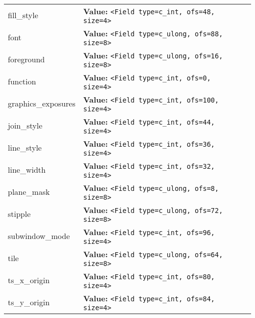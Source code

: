 \begin{longtable}{|p{\varnamewidth}|p{\vardescrwidth}|l}
\cline{1-2}
\raggedright f\-i\-l\-l\-\_\-s\-t\-y\-l\-e\- & \raggedright \textbf{Value:} 
{\tt {\textless}Field type=c\_int, ofs=48, size=4{\textgreater}}&\\
\cline{1-2}
\raggedright f\-o\-n\-t\- & \raggedright \textbf{Value:} 
{\tt {\textless}Field type=c\_ulong, ofs=88, size=8{\textgreater}}&\\
\cline{1-2}
\raggedright f\-o\-r\-e\-g\-r\-o\-u\-n\-d\- & \raggedright \textbf{Value:} 
{\tt {\textless}Field type=c\_ulong, ofs=16, size=8{\textgreater}}&\\
\cline{1-2}
\raggedright f\-u\-n\-c\-t\-i\-o\-n\- & \raggedright \textbf{Value:} 
{\tt {\textless}Field type=c\_int, ofs=0, size=4{\textgreater}}&\\
\cline{1-2}
\raggedright g\-r\-a\-p\-h\-i\-c\-s\-\_\-e\-x\-p\-o\-s\-u\-r\-e\-s\- & \raggedright \textbf{Value:} 
{\tt {\textless}Field type=c\_int, ofs=100, size=4{\textgreater}}&\\
\cline{1-2}
\raggedright j\-o\-i\-n\-\_\-s\-t\-y\-l\-e\- & \raggedright \textbf{Value:} 
{\tt {\textless}Field type=c\_int, ofs=44, size=4{\textgreater}}&\\
\cline{1-2}
\raggedright l\-i\-n\-e\-\_\-s\-t\-y\-l\-e\- & \raggedright \textbf{Value:} 
{\tt {\textless}Field type=c\_int, ofs=36, size=4{\textgreater}}&\\
\cline{1-2}
\raggedright l\-i\-n\-e\-\_\-w\-i\-d\-t\-h\- & \raggedright \textbf{Value:} 
{\tt {\textless}Field type=c\_int, ofs=32, size=4{\textgreater}}&\\
\cline{1-2}
\raggedright p\-l\-a\-n\-e\-\_\-m\-a\-s\-k\- & \raggedright \textbf{Value:} 
{\tt {\textless}Field type=c\_ulong, ofs=8, size=8{\textgreater}}&\\
\cline{1-2}
\raggedright s\-t\-i\-p\-p\-l\-e\- & \raggedright \textbf{Value:} 
{\tt {\textless}Field type=c\_ulong, ofs=72, size=8{\textgreater}}&\\
\cline{1-2}
\raggedright s\-u\-b\-w\-i\-n\-d\-o\-w\-\_\-m\-o\-d\-e\- & \raggedright \textbf{Value:} 
{\tt {\textless}Field type=c\_int, ofs=96, size=4{\textgreater}}&\\
\cline{1-2}
\raggedright t\-i\-l\-e\- & \raggedright \textbf{Value:} 
{\tt {\textless}Field type=c\_ulong, ofs=64, size=8{\textgreater}}&\\
\cline{1-2}
\raggedright t\-s\-\_\-x\-\_\-o\-r\-i\-g\-i\-n\- & \raggedright \textbf{Value:} 
{\tt {\textless}Field type=c\_int, ofs=80, size=4{\textgreater}}&\\
\cline{1-2}
\raggedright t\-s\-\_\-y\-\_\-o\-r\-i\-g\-i\-n\- & \raggedright \textbf{Value:} 
{\tt {\textless}Field type=c\_int, ofs=84, size=4{\textgreater}}&\\
\cline{1-2}
\end{longtable}

